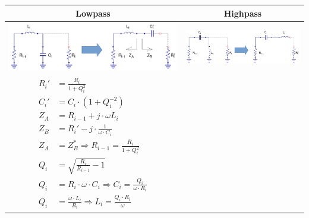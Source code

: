 \begin{table}[H]
  \centering
  \begin{tabular}{ | c | c | }
    \hline
    Lowpass & Highpass\\ \hline
    \begin{minipage}{.4\textwidth}
      \includegraphics[width=\linewidth]{cascaded-l-section-lowpass}
    \end{minipage}
    &
    \begin{minipage}{.4\textwidth}
      \includegraphics[width=\linewidth]{cascaded-l-section-highpass}
    \end{minipage}
\\ \hline
    \begin{minipage}{.4\textwidth}
         {\begin{align}
           R_i' &= \frac{R_i}{1 + Q_i^2} \\
           C_i' &= C_i \cdot (1 + Q_i^{-2}) \\
           Z_A &= R_{i-1} + j \cdot \omega L_i \\
           Z_B &= R_{i}' - j \cdot \frac{1}{\omega \cdot C_i} \\
           Z_A &= Z_B^* \Longrightarrow R_{i-1} = \frac{R_i}{1 + Q_i^2} \\
           Q_{i} &= \sqrt{\frac{R_{i}}{R_{i-1}} - 1} \\
           Q_{i} &= R_{i} \cdot \omega \cdot C_i \Longrightarrow C_i = \frac{Q_i}{\omega \cdot R_i}\\
           Q_{i} &= \frac{\omega \cdot L_i}{R_{i}} \Longrightarrow L_i = \frac{Q_i \cdot R_i}{\omega}
         \end{align}}
    \end{minipage}
    &
        \begin{minipage}{.4\textwidth}

\end{minipage}
\end{tabular}
\end{table}
